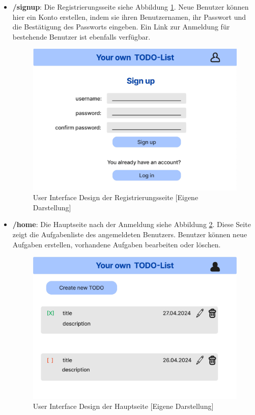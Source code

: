 \begin{itemize}
	\item \textbf{/signup}: Die Registrierungsseite siehe Abbildung \ref{UI_signUp}. Neue Benutzer können hier ein Konto erstellen, indem sie ihren Benutzernamen, ihr Passwort und die Bestätigung des Passworts eingeben. Ein Link zur Anmeldung für bestehende Benutzer ist ebenfalls verfügbar.
	
	\begin{figure}[h]
		\centering
		\includegraphics[clip,width=0.75\linewidth]{images/signUp.png}
		\caption[User Interface Design der Registrierungsseite]{User Interface Design der Registrierungsseite [Eigene Darstellung]}
		\label{UI_signUp}
	\end{figure}	
	
	\item \textbf{/home}: Die Hauptseite nach der Anmeldung siehe Abbildung \ref{UI_home}. Diese Seite zeigt die Aufgabenliste des angemeldeten Benutzers. Benutzer können neue Aufgaben erstellen, vorhandene Aufgaben bearbeiten oder löschen.
	
	\begin{figure}[h]
		\centering
		\includegraphics[clip,width=0.75\linewidth]{images/home.png}
		\caption[User Interface Design der Hauptseite]{User Interface Design der Hauptseite [Eigene Darstellung]}
		\label{UI_home}
	\end{figure}	
	

\end{itemize}
